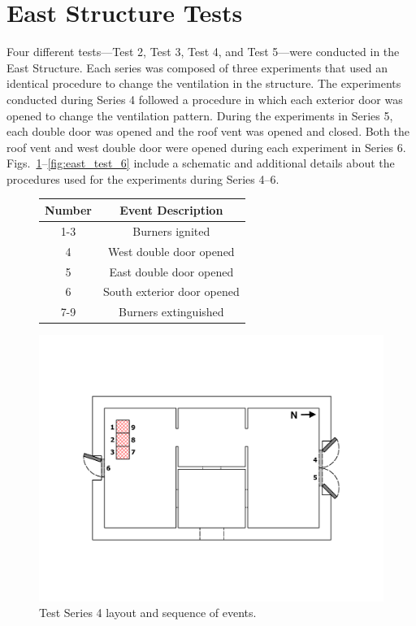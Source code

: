 \documentclass[12pt,oneside]{book}
\begin{document}
\section{East Structure Tests}
\label{sec:east_procedure}
Four different tests---Test 2, Test 3, Test 4, and Test 5---were conducted in the East Structure. Each series was composed of three experiments that used an identical procedure to change the ventilation in the structure. The experiments conducted during Series 4 followed a procedure in which each exterior door was opened to change the ventilation pattern. During the experiments in Series 5, each double door was opened and the roof vent was opened and closed. Both the roof vent and west double door were opened during each experiment in Series 6. Figs.~\ref{fig:east_test_4}--\ref{fig:east_test_6} include a schematic and additional details about the procedures used for the experiments during Series 4--6.

\begin{figure}[!ht]
\begin{minipage}[b]{0.8\columnwidth}
	\begin{flushleft}
	\small
	\begin{tabular}[b]{cc}
 	\toprule
 	\textbf{Number} & \textbf{Event Description} \\
 	\midrule
 	1-3  & Burners ignited \\
 	4	 & West double door opened \\
 	5 	 & East double door opened \\
 	6	 & South exterior door opened \\
 	7-9  & Burners extinguished \\
	\bottomrule
	\end{tabular}
	\end{flushleft}
\end{minipage}
\begin{minipage}[b]{0.9\columnwidth}
	\vspace{15pt}
	\centering
	\includegraphics[width=\columnwidth]{../Figures/Floor_Plans/East_Structure_Test_4}
\end{minipage}
\caption{Test Series 4 layout and sequence of events.}
\label{fig:east_test_4}
\end{figure}
\end{document}
